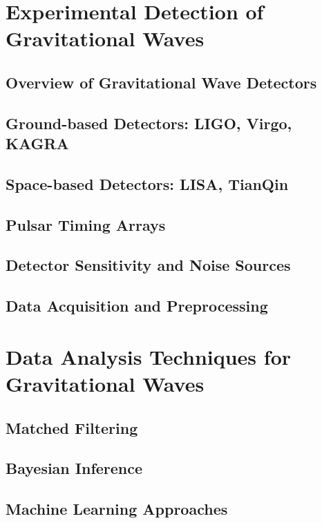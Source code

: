 \chapter{Experimental Detection of Gravitational Waves}\label{ch:experimental-detection-of-gravitational-waves}
\section{Overview of Gravitational Wave Detectors}\label{sec:overview-of-gravitational-wave-detectors}
\section{Ground-based Detectors: LIGO, Virgo, KAGRA}\label{sec:ground-based-detectors:-ligo-virgo-kagra}
\section{Space-based Detectors: LISA, TianQin}\label{sec:space-based-detectors:-lisa-tianqin}
\section{Pulsar Timing Arrays}\label{sec:pulsar-timing-arrays}
\section{Detector Sensitivity and Noise Sources}\label{sec:detector-sensitivity-and-noise-sources}
\section{Data Acquisition and Preprocessing}\label{sec:data-acquisition-and-preprocessing}

\chapter{Data Analysis Techniques for Gravitational Waves}\label{ch:data-analysis-techniques-for-gravitational-waves}
\section{Matched Filtering}\label{sec:matched-filtering}
\section{Bayesian Inference}\label{sec:bayesian-inference}
\section{Machine Learning Approaches}\label{sec:machine-learning-approaches}
